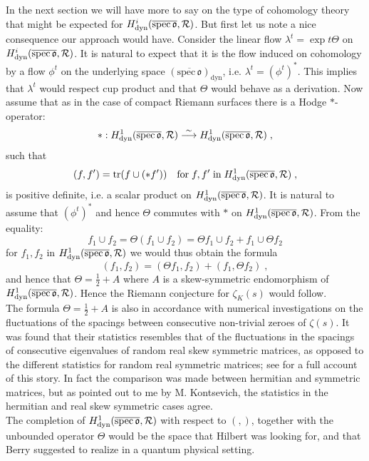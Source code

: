 \documentclass[11pt,leqno]{article}
\newcommand{\dyn}{\mathrm{dyn}}
\newcommand{\spec}{\mathrm{spec}\,}
\newcommand{\tr}{\mathrm{tr}}
\newcommand{\Rh}{{\cal R}}
\newcommand{\eo}{\mathfrak{o}}
\newcommand{\silo}{\stackrel{\sim}{\longrightarrow}}
\newcommand{\halb}{\frac{1}{2}}
\begin{document}
In the next section we will have more to say on the type of cohomology theory that might be expected for $H^i_{\dyn}  ( \overline{\spec \eo}  , \Rh)$. But first let us note a nice consequence our approach would have. Consider the linear flow $\lambda^t = \exp t \Theta$ on $H^i_{\dyn} ( \overline{\spec \eo}  , \Rh)$. It is natural to expect that it is the flow induced on cohomology by a flow $\phi^t$ on the underlying space $ (\overline{\spec \eo})_{\dyn}$, i.e. $\lambda^t = (\phi^t)^{\ast}$. This implies that $\lambda^t$ would respect cup product and that $\Theta$ would behave as a derivation. Now assume that as in the case of compact Riemann surfaces there is a Hodge $\ast$-operator:
\[
\ast : H^1_{\dyn} ( \overline{\spec \eo}  , \Rh) \silo H^1_{\dyn} ( \overline{\spec \eo}  , \Rh) \; ,
\]
such that
\[
(f , f') = \tr (f \cup (\ast f')) \quad \mbox{for} \; f , f' \; \mbox{in} \; H^1_{\dyn} ( \overline{\spec \eo}  , \Rh) \; ,
\]
is positive definite, i.e. a scalar product on $H^1_{\dyn} ( \overline{\spec \eo}  , \Rh)$. It is natural to assume that $(\phi^t)^{\ast}$ and hence $\Theta$ commutes with $\ast$ on $H^1_{\dyn} ( \overline{\spec \eo}  , \Rh)$. From the equality:
\[
f_1 \cup f_2 = \Theta (f_1 \cup f_2) = \Theta f_1 \cup f_2 + f_1 \cup \Theta f_2
\]
for $f_1 , f_2$ in $H^1_{\dyn} ( \overline{\spec \eo}  , \Rh)$ we would thus obtain the formula
\[
(f_1 , f_2) = (\Theta f_1 , f_2) + (f_1 , \Theta f_2) \; ,
\]
and hence that $\Theta = \halb + A$ where $A$ is a skew-symmetric endomorphism of $H^1_{\dyn} ( \overline{\spec \eo}  , \Rh)$. Hence the Riemann conjecture for $\zeta_K (s)$ would follow. \\
The formula $\Theta = \halb + A$ is also in accordance with numerical investigations on the fluctuations of the spacings between consecutive non-trivial zeroes of $\zeta (s)$. It was found that their statistics resembles that of the fluctuations in the spacings of consecutive eigenvalues of random real skew symmetric matrices, as opposed to the different statistics for random real symmetric matrices; see \cite{KS} for a full account of this story. In fact the comparison was made between hermitian and symmetric matrices, but as pointed out to me by M. Kontsevich, the statistics in the hermitian and real skew symmetric cases agree. \\
The completion of $H^1_{\dyn} ( \overline{\spec \eo}  , \Rh)$ with respect to $( , )$, together with the unbounded operator $\Theta$ would be the space that Hilbert was looking for, and that Berry \cite{B} suggested to realize in a quantum physical setting.
\end{document}
